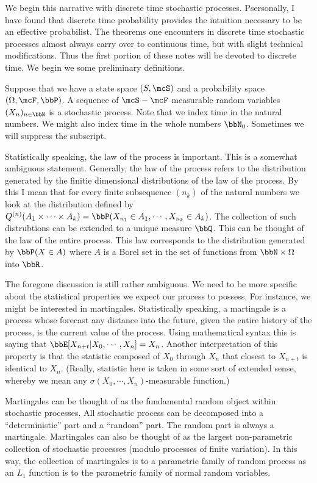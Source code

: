 \documentclass{report}
\begin{document}
We begin this narrative with discrete time stochastic processes.  Psersonally, I have found that discrete time probability provides the intuition necessary to be an effective probabilist.  The theorems one encounters in discrete time stochastic processes almost always carry over to continuous time, but with slight technical modifications.  Thus the first portion of these notes will be devoted to discrete time.  We begin we some preliminary definitions.

Suppose that we have a state space $(S,\mcS)$ and a probability space $(\Omega, \mcF, \bbP)$.  A sequence of $\mcS-\mcF$ measurable random variables $(X_n)_{n \in \bbN}$ is a stochastic process.  Note that we index time in the natural numbers.  We might also index time in the whole numbers $\bbN_0$.  Sometimes we will suppress the subscript.

Statistically speaking, the law of the process is important.  This is a somewhat ambiguous statement.  Generally, the law of the process refers to the distribution generated by the finitie dimensional distributions of the law of the process.  By this I mean that for every finite subsequence $(n_k)$ of the natural numbers we look at the distribution defined by $Q^{(n)}(A_1 \times \cdots \times A_k) = \bbP(X_{n_1} \in A_1, \cdots, X_{n_k} \in A_k)$.  The collection of such distrubtions can be extended to a unique measure $\bbQ$.  This can be thought of the law of the entire process.  This law corresponds to the distribution generated by $\bbP(X \in A)$ where $A$ is a Borel set in the set of functions from $\bbN \times \Omega$ into $\bbR$.

The foregone discussion is still rather ambiguous.  We need to be more specific about the statistical properties we expect our process to possess.  For instance, we might be interested in martingales.  Statistically speaking, a martingale is a process whose forecast any distance into the future, given the entire history of the process, is the current value of the process.  Using mathematical syntax this is saying that $\bbE[X_{n+t} | X_0, \cdots, X_n ] = X_n$.  Another interpretation of this property is that the statistic composed of $X_0$ through $X_n$ that closest to $X_{n+t}$ is identical to $X_n$.  (Really, statistic here is taken in some sort of extended sense, whereby we mean any $\sigma(X_0, \cdots, X_n)$-measurable function.) 

Martingales can be thought of as the fundamental random object within stochastic processes.  All stochastic process can be decomposed into a ``deterministic'' part and a ``random'' part.  The random part is always a martingale.  Martingales can also be thought of as the largest non-parametric collection of stochastic processes (modulo processes of finite variation).  In this way, the collection of martingales is to a parametric family of random process as an $L_1$ function is to the parametric family of normal random variables.
\end{document}
